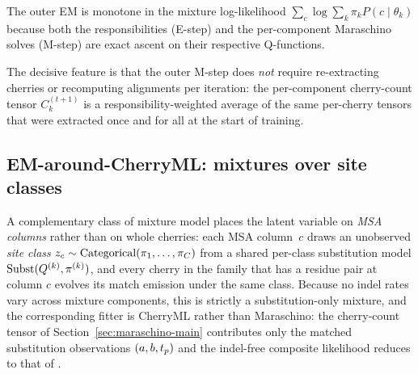 \noindent
The outer EM is monotone in the mixture log-likelihood
$\sum_c \log\sum_k \pi_k P(c\mid\theta_k)$ because both the
responsibilities (E-step) and the per-component Maraschino solves
(M-step) are exact ascent on their respective Q-functions.

The decisive feature is that the outer M-step does \emph{not} require
re-extracting cherries or recomputing alignments per iteration:
the per-component cherry-count tensor $C_k^{(t+1)}$ is a
responsibility-weighted average of the same per-cherry tensors that
were extracted once and for all at the start of training.

\subsection{EM-around-CherryML: mixtures over site classes}
\label{sec:em-around-cherryml}

A complementary class of mixture model places the latent variable on
\emph{MSA columns} rather than on whole cherries: each MSA column~$c$
draws an unobserved \emph{site class}
$z_c \sim {\mbox{Categorical}}(\pi_1,\ldots,\pi_C)$ from a shared per-class
substitution model ${\mbox{Subst}}(Q^{(k)}, \pi^{(k)})$, and every
cherry in the family that has a residue pair at column $c$ evolves
its match emission under the same class.  Because no indel rates
vary across mixture components, this is strictly a substitution-only
mixture, and the corresponding fitter is CherryML rather than
Maraschino: the cherry-count tensor of
Section~\ref{sec:maraschino-main} contributes only the matched
substitution observations $(a, b, t_p)$ and the
indel-free composite likelihood reduces to that of
\cite{Prillo2022CherryML}.

